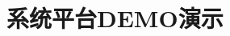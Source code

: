 \documentclass[aspectratio=43, 10pt, utf8, mathserif]{beamer}
\begin{document}
%	
%
%	
%
%	
%
%	

\section{系统平台DEMO演示}
\end{document}

